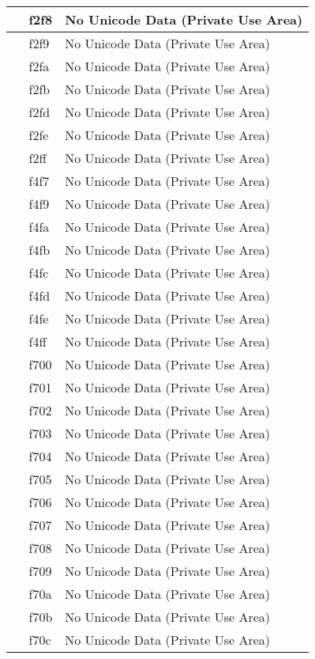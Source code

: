 \documentclass[12pt,letterpaper,openany]{book}
\begin{document}
\begin{center}
\begin{supertabular}{|m{0.25in}|m{0.5in}|m{4in}|}
 & f2f8 & No Unicode Data (Private Use Area)\\\hline
 & f2f9 & No Unicode Data (Private Use Area)\\\hline
 & f2fa & No Unicode Data (Private Use Area)\\\hline
 & f2fb & No Unicode Data (Private Use Area)\\\hline
 & f2fd & No Unicode Data (Private Use Area)\\\hline
 & f2fe & No Unicode Data (Private Use Area)\\\hline
 & f2ff & No Unicode Data (Private Use Area)\\\hline
 & f4f7 & No Unicode Data (Private Use Area)\\\hline
 & f4f9 & No Unicode Data (Private Use Area)\\\hline
 & f4fa & No Unicode Data (Private Use Area)\\\hline
 & f4fb & No Unicode Data (Private Use Area)\\\hline
 & f4fc & No Unicode Data (Private Use Area)\\\hline
 & f4fd & No Unicode Data (Private Use Area)\\\hline
 & f4fe & No Unicode Data (Private Use Area)\\\hline
 & f4ff & No Unicode Data (Private Use Area)\\\hline
 & f700 & No Unicode Data (Private Use Area)\\\hline
 & f701 & No Unicode Data (Private Use Area)\\\hline
 & f702 & No Unicode Data (Private Use Area)\\\hline
 & f703 & No Unicode Data (Private Use Area)\\\hline
 & f704 & No Unicode Data (Private Use Area)\\\hline
 & f705 & No Unicode Data (Private Use Area)\\\hline
 & f706 & No Unicode Data (Private Use Area)\\\hline
 & f707 & No Unicode Data (Private Use Area)\\\hline
 & f708 & No Unicode Data (Private Use Area)\\\hline
 & f709 & No Unicode Data (Private Use Area)\\\hline
 & f70a & No Unicode Data (Private Use Area)\\\hline
 & f70b & No Unicode Data (Private Use Area)\\\hline
 & f70c & No Unicode Data (Private Use Area)\\\hline

\end{supertabular}
\end{center}
\end{document}
